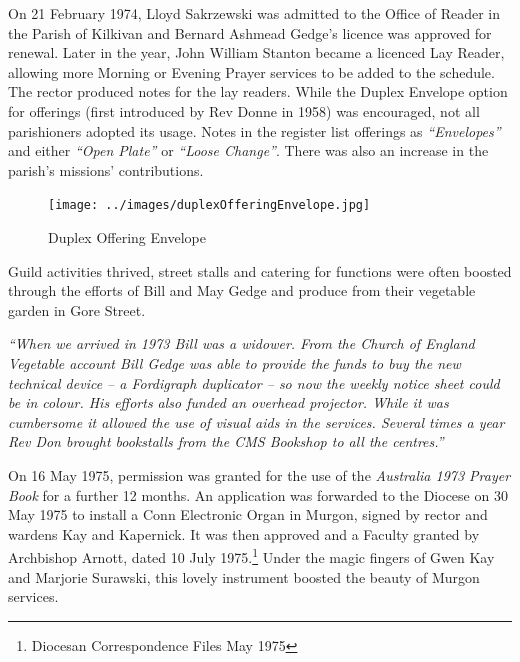 On 21 February 1974, Lloyd Sakrzewski was admitted to the Office of Reader in the Parish of Kilkivan and Bernard Ashmead Gedge's licence was approved for renewal. Later in the year, John William Stanton became a licenced Lay Reader, allowing more Morning or Evening Prayer services to be added to the schedule. The rector produced notes for the lay readers. While the Duplex Envelope option for offerings (first introduced by Rev Donne in 1958) was encouraged, not all parishioners adopted its usage. Notes in the register list offerings as \emph{``Envelopes''} and either \emph{``Open Plate''} or \emph{``Loose Change''}. There was also an increase in the parish's missions' contributions.









\begin{figure}
\begin{center}
\texttt{[image: ../images/duplexOfferingEnvelope.jpg]}
\caption{Duplex Offering Envelope}
\end{center}
\end{figure}




Guild activities thrived, street stalls and catering for functions were often boosted through the efforts of Bill and May Gedge and produce from their vegetable garden in Gore Street.



\emph{``When we arrived in 1973 Bill was a widower. From the Church of England Vegetable account Bill Gedge was able to provide the funds to buy the new technical device -- a Fordigraph duplicator -- so now the weekly notice sheet could be in colour. His efforts also funded an overhead projector. While it was cumbersome it allowed the use of visual aids in the services. Several times a year Rev Don brought bookstalls from the CMS Bookshop to all the centres.''}



On 16 May 1975, permission was granted for the use of the \emph{Australia 1973 Prayer Book} for a further 12 months. An application was forwarded to the Diocese on 30 May 1975 to install a Conn Electronic Organ in Murgon, signed by rector and wardens Kay and Kapernick. It was then approved and a Faculty granted by Archbishop Arnott, dated 10 July 1975.\footnote{Diocesan Correspondence Files May 1975} Under the magic fingers of Gwen Kay and Marjorie Surawski, this lovely instrument boosted the beauty of Murgon services.


